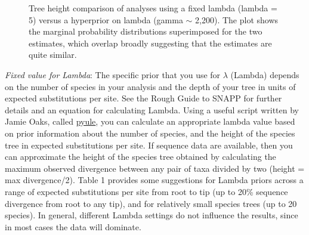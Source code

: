 {     \begin{figure}[htbp]
        \centering
        \caption{Tree height comparison of analyses using a fixed lambda (lambda = 5) versus a hyperprior on lambda (gamma {$\sim$} 2,200). The plot shows the marginal probability distributions superimposed for the two estimates, which overlap broadly suggesting that the estimates are quite similar.}
        \label{fig:lambda_comparision}
    \end{figure}  
    
    
\textit{Fixed value for Lambda}: The specific prior that you use for {$\lambda$} (Lambda) depends on the number of species in your analysis and the depth of your tree in units of expected substitutions per site. See the Rough Guide to SNAPP for further details and an equation for calculating Lambda. Using a useful script written by Jamie Oaks, called \href{https://github.com/joaks1/pyule}{pyule}, you can calculate an appropriate lambda value based on prior information about the number of species, and the height of the species tree in expected substitutions per site. If sequence data are available, then you can approximate the height of the species tree obtained by calculating the maximum observed divergence between any pair of taxa divided by two (height = max divergence/2). 
   \newpage
Table 1 provides some suggestions for Lambda priors across a range of expected substitutions per site from root to tip (up to 20\% sequence divergence from root to any tip), and for relatively small species trees (up to 20 species). In general, different Lambda settings do not influence the results, since in most cases the data will dominate. 

}
